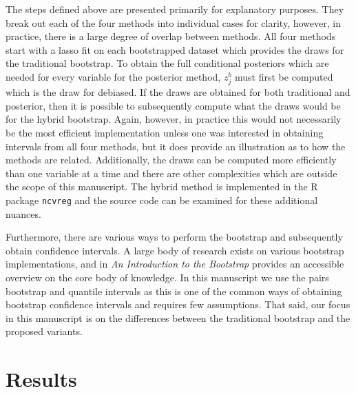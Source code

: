 

The steps defined above are presented primarily for explanatory purposes. They break out each of the four methods into individual cases for clarity, however, in practice, there is a large degree of overlap between methods. All four methods start with a lasso fit on each bootstrapped dataset which provides the draws for the traditional bootstrap. To obtain the full conditional posteriors which are needed for every variable for the posterior method, $z^b_j$ must first be computed which is the draw for debiased. If the draws are obtained for both traditional and posterior, then it is possible to subsequently compute what the draws would be for the hybrid bootstrap. Again, however, in practice this would not necessarily be the most efficient implementation unless one was interested in obtaining intervals from all four methods, but it does provide an illustration as to how the methods are related. Additionally, the draws can be computed more efficiently than one variable at a time and there are other complexities which are outside the scope of this manuscript. The hybrid method is implemented in the R package \texttt{ncvreg} and the source code can be examined for these additional nuances.


Furthermore, there are various ways to perform the bootstrap and subsequently obtain confidence intervals. A large body of research exists on various bootstrap implementations, and \cite{Efron1994} in \textit{An Introduction to the Bootstrap} provides an accessible overview on the core body of knowledge. In this manuscript we use the pairs bootstrap and quantile intervals as this is one of the common ways of obtaining bootstrap confidence intervals and requires few assumptions. That said, our focus in this manuscript is on the differences between the traditional bootstrap and the proposed variants.

\section{Results}
\label{Sec:results}

